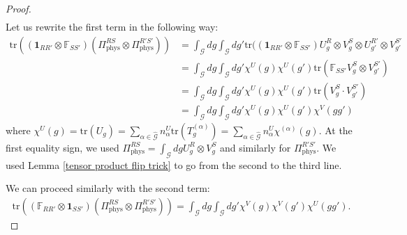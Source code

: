 \documentclass[aps,10pt,twocolumn,showpacs,pra,citeautoscript,amsmath,amssymb,floatfix,superscriptaddress]{revtex4-1}
\def\phys{{\mathrm{phys}}}
\def\tr{{\mathrm{tr}}}
\newcommand{\cg}{\mathcal G}
\begin{document}
\begin{proof}
\begin{align*}
\end{align*}
Let us rewrite the first term in the following way:
\begin{align*}
    \tr ((\mathbf{1}_{RR'} \otimes \mathbb{F}_{SS'}) (\Pi_\phys^{RS}\otimes \Pi_\phys^{R'S'}) ) &= \int_{\cg} dg \int_\cg dg' \tr ((\mathbf{1}_{RR'} \otimes \mathbb{F}_{SS'}) U_g^R \otimes V_g^S \otimes U_{g'}^{R'} \otimes V^{S'}_{g'} \nonumber\\ 
    &=\int_{\cg} dg \int_\cg dg' \chi^U(g) \chi^U(g') \tr(\mathbb{F}_{SS'}V_g^S \otimes V^{S'}_{g'}) \nonumber\\
    &=\int_{\cg} dg \int_\cg dg' \chi^U(g) \chi^U(g') \tr(V_g^S \cdot V^{S'}_{g'}) \nonumber\\
    &= \int_{\cg} dg \int_\cg dg' \chi^U(g) \chi^U(g')\chi^V(gg')
\end{align*}
where $\chi^U(g)=\tr(U_g) =  \sum_{\alpha \in \hat{\cg}} n_{\alpha}^U \tr(T_g^{(\alpha)}) =\sum_{\alpha \in \hat{\cg}} n_{\alpha}^U \chi^{(\alpha)}(g)$. At the first equality sign, we used $\Pi_\phys^{RS}=\int_{\cg} dg U_g^R\otimes V_g^S$ and similarly for $\Pi_\phys^{R'S'}$. We used Lemma \ref{tensor product flip trick} to go from the second to the third line. 

We can proceed similarly with the second term:
\begin{align*}
    \tr ((\mathbb{F}_{RR'} \otimes \mathbf{1}_{SS'}) (\Pi_\phys^{RS}\otimes \Pi_\phys^{R'S'}) ) = \int_{\cg} dg \int_\cg dg' \chi^V(g) \chi^V(g')\chi^U(gg').
\end{align*}


\end{proof}
\end{document}
